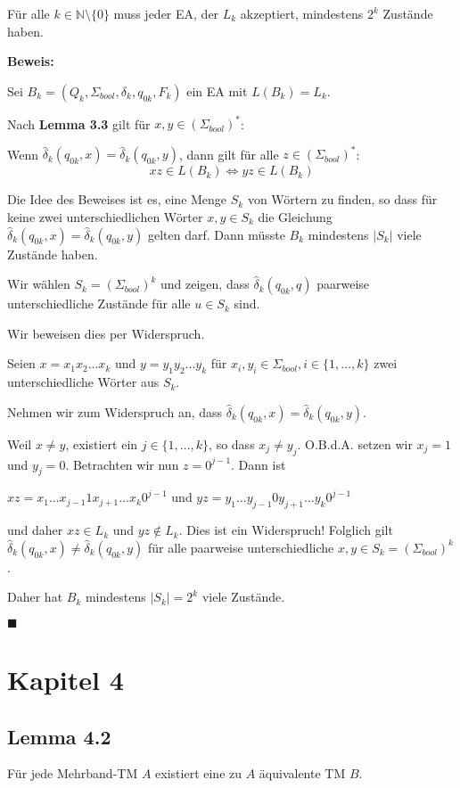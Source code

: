 \documentclass[a4paper, 11pt]{article}
\def\N{\mathbb{N}}
\begin{document}
    Für alle $k \in \N\setminus\{0\}$ muss jeder EA, der $L_k$ akzeptiert, mindestens $2^k$ Zustände haben.

    \textbf{Beweis: }

    Sei $B_k = (Q_k, \Sigma_{bool}, \delta_k, q_{0k}, F_k)$ ein EA mit $L(B_k) = L_k$. 
    
    Nach \textbf{Lemma 3.3} gilt für $x,y \in (\Sigma_{bool})^*$:

    Wenn $\hat{\delta}_k (q_{0k}, x) = \hat{\delta}_k (q_{0k}, y)$, dann gilt für alle $z \in (\Sigma_{bool})^*$:
    $$xz \in L(B_k) \iff yz \in L(B_k)$$

    Die Idee des Beweises ist es, eine Menge $S_k$ von Wörtern zu finden, so dass für keine zwei unterschiedlichen Wörter $x, y \in S_k$ die Gleichung $\hat{\delta}_k (q_{0k}, x) = \hat{\delta}_k (q_{0k}, y)$ gelten darf. 
    Dann müsste $B_k$ mindestens $|S_k|$ viele Zustände haben.

    Wir wählen $S_k = (\Sigma_{bool})^k$ und zeigen, dass $\hat{\delta}_k(q_{0k}, q)$ paarweise unterschiedliche Zustände für alle $u \in  S_k$ sind. 

    Wir beweisen dies per Widerspruch. 

    Seien $x = x_1x_2...x_k$ und $y = y_1y_2...y_k$ für $x_i,y_i \in \Sigma_{bool}, i \in \{1, ..., k\}$ zwei unterschiedliche Wörter aus $S_k$.

    Nehmen wir zum Widerspruch an, dass $\hat{\delta}_k(q_{0k}, x) = \hat{\delta}_k(q_{0k}, y)$.
    
    Weil $x \neq y$, existiert ein $j \in \{1, ...,k\}$, so dass $x_j \neq y_j$. O.B.d.A. setzen wir $x_j = 1$ und $y_j = 0$. 
    Betrachten wir nun $z = 0^{j-1}$.  Dann ist 

    $xz = x_1...x_{j-1}1x_{j+1}...x_k0^{j-1}$ und $yz = y_1...y_{j-1}0y_{j+1}...y_k0^{j-1}$

    und daher $xz \in L_k$ und $yz \notin L_k$. Dies ist ein Widerspruch! Folglich gilt $\hat{\delta}_k(q_{0k}, x) \neq \hat{\delta}_k(q_{0k}, y)$ für alle paarweise unterschiedliche $x,y \in S_k = (\Sigma_{bool})^k$.
    
    Daher hat $B_k$ mindestens $|S_k| = 2^k$ viele Zustände.
    
    \hspace*{0pt}\hfill$\blacksquare$

    \section*{Kapitel 4}
    \subsection*{Lemma 4.2}
    Für jede Mehrband-TM $A$ existiert eine zu $A$ äquivalente TM $B$.
\end{document}
